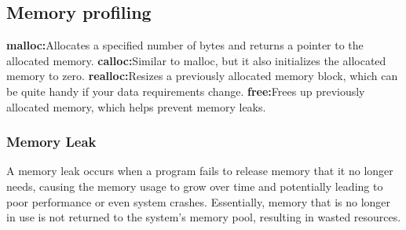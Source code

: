 \documentclass{article}
\begin{document}
\subsection{Memory profiling}
\textnormal{\textbf{malloc:}Allocates a specified number of bytes and returns a pointer to the allocated memory.}
\newline
\textnormal{\textbf{calloc:}Similar to malloc, but it also initializes the allocated memory to zero.}
\newline
\textnormal{\textbf{realloc:}Resizes a previously allocated memory block, which can be quite handy if your data requirements change.}
\newline
\textnormal{\textbf{free:}Frees up previously allocated memory, which helps prevent memory leaks.}
\subsubsection{Memory Leak}
\textnormal{A memory leak occurs when a program fails to release memory that it no longer needs, causing the memory usage to grow over time and potentially leading to poor performance or even system crashes. Essentially, memory that is no longer in use is not returned to the system's memory pool, resulting in wasted resources.}
\end{document}

